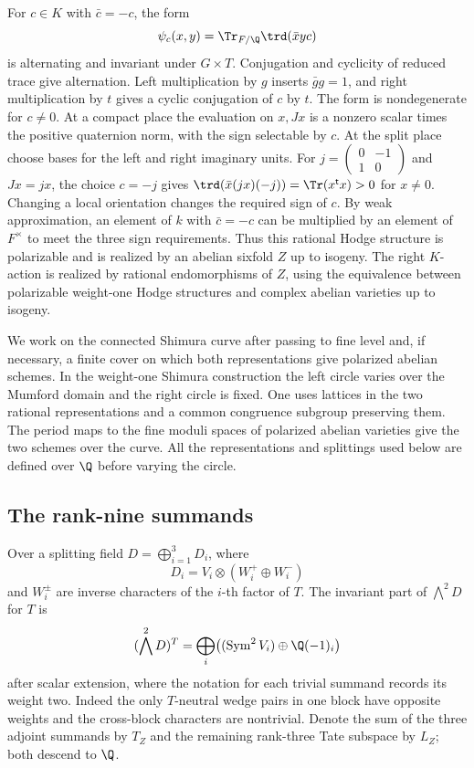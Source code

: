 For \(c\in K\) with \(\bar c=-c\), the form
\[
 \psi_c(x,y)=\Tr_{F/\Q}\trd(\bar xyc)
\]
is alternating and invariant under \(G\times T\). Conjugation and cyclicity of reduced trace give alternation. Left multiplication by \(g\) inserts \(\bar gg=1\), and right multiplication by \(t\) gives a cyclic conjugation of \(c\) by \(t\). The form is nondegenerate for \(c\ne0\). At a compact place the evaluation on \(x,Jx\) is a nonzero scalar times the positive quaternion norm, with the sign selectable by \(c\). At the split place choose bases for the left and right imaginary units. For \(j=\left(\begin{smallmatrix}0&-1\\1&0\end{smallmatrix}\right)\) and \(Jx=jx\), the choice \(c=-j\) gives
\(\trd(\bar x(jx)(-j))=\Tr(x^{\mathsf t}x)>0\) for \(x\ne0\). Changing a local orientation changes the required sign of \(c\). By weak approximation, an element of \(k\) with \(\bar c=-c\) can be multiplied by an element of \(F^\times\) to meet the three sign requirements. Thus this rational Hodge structure is polarizable and is realized by an abelian sixfold \(Z\) up to isogeny. The right \(K\)-action is realized by rational endomorphisms of \(Z\), using the equivalence between polarizable weight-one Hodge structures and complex abelian varieties up to isogeny.

We work on the connected Shimura curve after passing to fine level and, if necessary, a finite cover on which both representations give polarized abelian schemes. In the weight-one Shimura construction the left circle varies over the Mumford domain and the right circle is fixed. One uses lattices in the two rational representations and a common congruence subgroup preserving them. The period maps to the fine moduli spaces of polarized abelian varieties give the two schemes over the curve. All the representations and splittings used below are defined over \(\Q\) before varying the circle.

\subsection{The rank-nine summands}

Over a splitting field \(D=\bigoplus_{i=1}^3 D_i\), where
\[
 D_i=V_i\otimes(W_i^+\oplus W_i^-)
\]
and \(W_i^\pm\) are inverse characters of the \(i\)-th factor of \(T\). The invariant part of \(\bigwedge^2 D\) for \(T\) is
\begin{equation}\label{v7:eq:invariants}
 (\bigwedge^2 D)^T
 = \bigoplus_i \bigl((\operatorname{Sym}^2 V_i)\oplus\Q(-1)_i\bigr)
\end{equation}
after scalar extension, where the notation for each trivial summand records its weight two. Indeed the only \(T\)-neutral wedge pairs in one block have opposite weights and the cross-block characters are nontrivial. Denote the sum of the three adjoint summands by \(T_Z\) and the remaining rank-three Tate subspace by \(L_Z\); both descend to \(\Q\).

